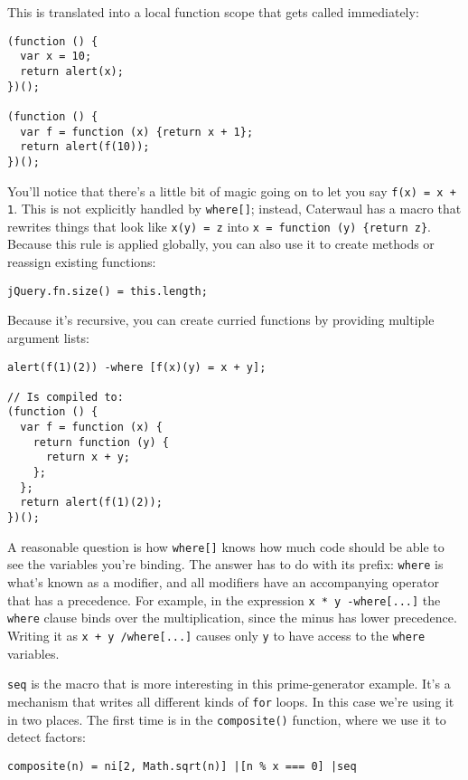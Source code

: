 \documentclass{report}
\begin{document}
    This is translated into a local function scope that gets called immediately:

\begin{verbatim}
(function () {
  var x = 10;
  return alert(x);
})();

(function () {
  var f = function (x) {return x + 1};
  return alert(f(10));
})();
\end{verbatim}

    You'll notice that there's a little bit of magic going on to let you say {\tt f(x) = x + 1}. This is not explicitly handled by {\tt where[]}; instead, Caterwaul has a macro that rewrites
    things that look like {\tt x(y) = z} into \verb|x = function (y) {return z}|. Because this rule is applied globally, you can also use it to create methods or reassign existing functions:

\begin{verbatim}
jQuery.fn.size() = this.length;
\end{verbatim}

    Because it's recursive, you can create curried functions by providing multiple argument lists:

\begin{verbatim}
alert(f(1)(2)) -where [f(x)(y) = x + y];

// Is compiled to:
(function () {
  var f = function (x) {
    return function (y) {
      return x + y;
    };
  };
  return alert(f(1)(2));
})();
\end{verbatim}

    A reasonable question is how {\tt where[]} knows how much code should be able to see the variables you're binding. The answer has to do with its prefix: {\tt where} is what's known as a
    modifier, and all modifiers have an accompanying operator that has a precedence. For example, in the expression {\tt x * y -where[...]} the {\tt where} clause binds over the
    multiplication, since the minus has lower precedence. Writing it as {\tt x + y /where[...]} causes only {\tt y} to have access to the {\tt where} variables.

    {\tt seq} is the macro that is more interesting in this prime-generator example. It's a mechanism that writes all different kinds of {\tt for} loops. In this case we're using it in two
    places. The first time is in the {\tt composite()} function, where we use it to detect factors:

\begin{verbatim}
composite(n) = ni[2, Math.sqrt(n)] |[n % x === 0] |seq
\end{verbatim}
\end{document}

